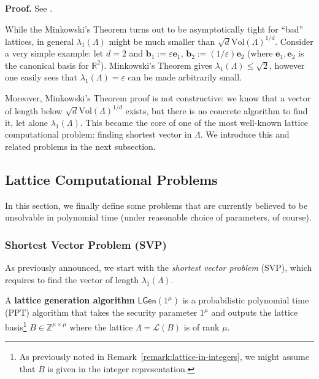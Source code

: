 \documentclass{template}
\begin{document}
\textbf{Proof.} See \cite[Section 1.3]{complexity-goldwasser}.

While the Minkowski's Theorem turns out to be asymptotically tight for ``bad''
lattices, in general $\lambda_1(\Lambda)$ might be much smaller than
$\sqrt{d}\text{Vol}(\Lambda)^{1/d}$. Consider a very simple example: let $d=2$
and $\mathbf{b}_1 := \varepsilon \mathbf{e}_1$, $\mathbf{b}_2 :=
(1/\varepsilon)\mathbf{e}_2$ (where $\mathbf{e}_1,\mathbf{e}_2$ is the canonical
basis for $\mathbb{R}^2$). Minkowski's Theorem gives $\lambda_1(\Lambda) \leq
\sqrt{2}$, however one easily sees that $\lambda_1(\Lambda) = \varepsilon$ can
be made arbitrarily small.

Moreover, Minkowski's Theorem proof is not constructive: we know that a vector
of length below $\sqrt{d}\text{Vol}(\Lambda)^{1/d}$ exists, but there is no
concrete algorithm to find it, let alone $\lambda_1(\Lambda)$. This became the
core of one of the most well-known lattice computational problem: finding
shortest vector in $\Lambda$. We introduce this and related problems in the next
subsection.

\subsection{Lattice Computational Problems}

In this section, we finally define some problems that are currently believed to
be unsolvable in polynomial time (under reasonable choice of parameters, of
course). 

\subsubsection{Shortest Vector Problem (SVP)}

As previously announced, we start with the \textit{shortest vector
problem} (SVP), which requires to find the vector of length
$\lambda_1(\Lambda)$.

\begin{definition}
    A \textbf{lattice generation algorithm} $\mathsf{LGen}(1^{\mu})$ is a
    probabilistic polynomial time (PPT) algorithm that takes the security
    parameter $1^{\mu}$ and outputs the lattice basis\footnote{As previously
    noted in Remark~\ref{remark:lattice-in-integers}, we might assume that $B$
    is given in the integer representation.} $B \in \mathbb{Z}^{\mu \times \mu}$
    where the lattice $\Lambda=\mathcal{L}(B)$ is of rank $\mu$.
\end{definition}
\end{document}
